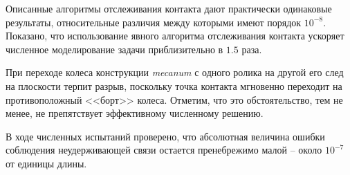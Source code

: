 Описанные алгоритмы отслеживания контакта дают практически одинаковые результаты, относительные различия между которыми имеют порядок $10^{-8}$. Показано, что использование явного алгоритма отслеживания контакта ускоряет численное моделирование задачи приблизительно в $1.5$ раза.

При переходе колеса конструкции \textit{mecanum} с одного ролика на другой его след на плоскости терпит разрыв, поскольку точка контакта мгновенно переходит на противоположный <<борт>> колеса. Отметим, что это обстоятельство, тем не менее, не препятствует эффективному численному решению.

%

В ходе численных испытаний проверено, что абсолютная величина ошибки соблюдения неудерживающей связи 
остается пренебрежимо малой -- около $10^{-7}$ от единицы длины.

